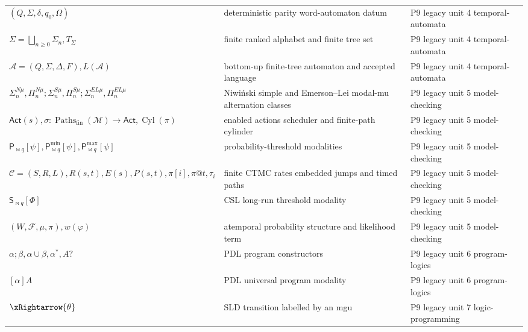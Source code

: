 \begin{longtable}{@{}p{}p{}p{}@{}}
\((Q,\allowbreak \Sigma,\allowbreak \delta,\allowbreak q_0,\allowbreak \Omega)\) & deterministic parity word-automaton datum & P9 legacy unit 4 temporal-\allowbreak{}automata \\
\(\Sigma=\bigsqcup_{n\geq0}\Sigma_n,\allowbreak T_\Sigma\) & finite ranked alphabet and finite tree set & P9 legacy unit 4 temporal-\allowbreak{}automata \\
\(\mathcal A=(Q,\allowbreak \Sigma,\allowbreak \Delta,\allowbreak F),\allowbreak L(\mathcal A)\) & bottom-up finite-tree automaton and accepted language & P9 legacy unit 4 temporal-\allowbreak{}automata \\
\(\Sigma_n^{N\mu},\allowbreak \Pi_n^{N\mu};\allowbreak \Sigma_n^{S\mu},\allowbreak \Pi_n^{S\mu};\allowbreak \Sigma_n^{EL\mu},\allowbreak \Pi_n^{EL\mu}\) & Niwiński simple and Emerson--Lei modal-mu alternation classes & P9 legacy unit 5 model-\allowbreak{}checking \\
\(\mathsf{Act}(s),\allowbreak \sigma:\operatorname{Paths}_{\mathrm{fin}}(\mathcal M)\to\mathsf{Act},\allowbreak \operatorname{Cyl}(\pi)\) & enabled actions scheduler and finite-path cylinder & P9 legacy unit 5 model-\allowbreak{}checking \\
\(\mathsf P_{\bowtie q}[\psi],\allowbreak \mathsf P^{\min}_{\bowtie q}[\psi],\allowbreak \mathsf P^{\max}_{\bowtie q}[\psi]\) & probability-threshold modalities & P9 legacy unit 5 model-\allowbreak{}checking \\
\(\mathcal C=(S,\allowbreak R,\allowbreak L),\allowbreak R(s,\allowbreak t),\allowbreak E(s),\allowbreak P(s,\allowbreak t),\allowbreak \pi[i],\allowbreak \pi@t,\allowbreak \tau_i\) & finite CTMC rates embedded jumps and timed paths & P9 legacy unit 5 model-\allowbreak{}checking \\
\(\mathsf S_{\bowtie q}[\Phi]\) & CSL long-run threshold modality & P9 legacy unit 5 model-\allowbreak{}checking \\
\((W,\allowbreak \mathcal F,\allowbreak \mu,\allowbreak \pi),\allowbreak w(\varphi)\) & atemporal probability structure and likelihood term & P9 legacy unit 5 model-\allowbreak{}checking \\
\(\alpha;\allowbreak \beta,\allowbreak \alpha\cup\beta,\allowbreak \alpha^*,\allowbreak A?\) & PDL program constructors & P9 legacy unit 6 program-\allowbreak{}logics \\
\([\alpha]A\) & PDL universal program modality & P9 legacy unit 6 program-\allowbreak{}logics \\
\(\xRightarrow{\theta}\) & SLD transition labelled by an mgu & P9 legacy unit 7 logic-\allowbreak{}programming \\

\end{longtable}
